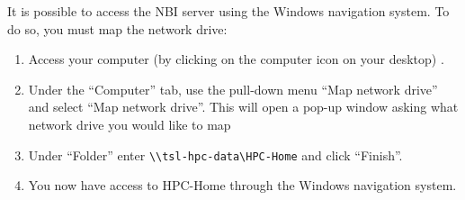 \documentclass[
  letterpaper,
  DIV=11,
  numbers=noendperiod]{scrreprt}
\providecommand{\tightlist}{%
  \setlength{\itemsep}{0pt}\setlength{\parskip}{0pt}}\usepackage{longtable,booktabs,array}
\begin{document}
It is possible to access the NBI server using the Windows navigation
system. To do so, you must map the network drive:

\begin{enumerate}
\def\labelenumi{\arabic{enumi}.}
\tightlist
\item
  Access your computer (by clicking on the computer icon on your
  desktop) .
\item
  Under the ``Computer'' tab, use the pull-down menu ``Map network
  drive'' and select ``Map network drive''. This will open a pop-up
  window asking what network drive you would like to map
\item
  Under ``Folder'' enter
  \texttt{\textbackslash{}\textbackslash{}tsl-hpc-data\textbackslash{}HPC-Home}
  and click ``Finish''.
\item
  You now have access to HPC-Home through the Windows navigation system.
\end{enumerate}
\end{document}
